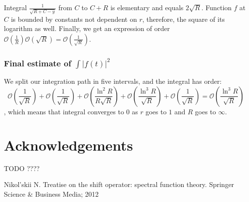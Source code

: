 \documentclass{gCOV2e}
\theoremstyle{plain}%
\theoremstyle{definition}
\theoremstyle{remark}
\newcommand{\mcO}{\mathcal{O}} %
\newcommand\abs[1]{\left|#1\right|}
\begin{document}
Integral $\frac{1}{\sqrt{R + C - y}}$ from $C$ to $C + R$ is elementary and equals $2 \sqrt{R}$. Function $f$ at $C$ is bounded by constants not dependent on $r$, therefore, the square of its logarithm as well. Finally, we get an expression of order $\mcO \left( \frac{1}{R} \right) \mcO( \sqrt R ) = \mcO \left( \frac{1}{\sqrt{R}} \right)$.

\subsubsection{Final estimate of $\int \abs{f(t)}^2$}
We split our integration path in five intervals, and the integral has order:
\[
\mcO \left( \frac{1}{\sqrt{R}} \right) + \mcO \left( \frac{1}{\sqrt{R}} \right) +\mcO\left(\frac{\ln^2 R}{R \sqrt{R}}\right) + \mcO\left( \frac{\ln^3 R}{\sqrt{R}} \right) + \mcO \left( \frac{1}{\sqrt{R}} \right) = \mcO\left( \frac{\ln^3 R}{\sqrt{R}} \right)
\]
, which means that integral converges to $0$ as $r$ goes to $1$ and $R$ goes to $\infty$.

\section*{Acknowledgements}
TODO ????

\begin{thebibliography}{99}

Nikol'skii N. Treatise on the shift operator: spectral function theory. Springer Science \& Business Media; 2012

\end{thebibliography}
\end{document}
